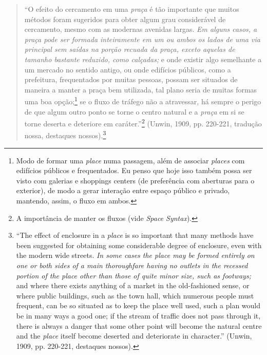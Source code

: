 \documentclass[12pt, a4paper]{book} %
\begin{document}
        \begin{quotation}
            ``O efeito do cercamento em uma \textit{praça} é tão importante que muitos métodos foram sugeridos para obter algum grau considerável de cercamento, mesmo com as modernas avenidas largas. \textit{Em alguns casos, a praça pode ser formada inteiramente em um ou ambos os lados de uma via principal sem saídas na porção recuada da praça, exceto aquelas de tamanho bastante reduzido, como calçadas;} e onde existir algo semelhante a um mercado no sentido antigo, ou onde edifícios públicos, como a prefeitura, frequentados por muitas pessoas, possam ser situados de maneira a manter a praça bem utilizada, tal plano seria de muitas formas uma boa opção;\footnote[67]{Modo de formar uma \textit{place} numa passagem, além de associar \textit{places} com edifícios públicos e frequentados.
            Eu penso que hoje isso também possa ser visto com galerias e shoppings centers (de preferência com aberturas para o exterior), de modo a gerar interação entre espaço público e privado, mantendo, assim, o fluxo em ambos.} se o fluxo de tráfego não a atravessar, há sempre o perigo de que algum outro ponto se torne o centro natural e a \textit{praça} em si se torne deserta e deteriore em caráter.''\footnote[68]{A importância de manter os fluxos (vide \textit{Space Syntax}).} (Unwin, 1909, pp. 220-221, tradução nossa, destaques nossos).\footnote[69]{``The effect of enclosure in a \textit{place} is so important that many methods have been suggested for obtaining some considerable degree of enclosure, even with the modern wide streets. \textit{In some cases the place may be formed entirely on one or both sides of a main thoroughfare having no outlets in the recessed portion of the place other than those of quite minor size, such as footways;} and where there exists anything of a market in the old-fashioned sense, or where public buildings, such as the town hall, which numerous people must frequent, can be so situated as to keep the place well used, such a plan would be in many ways a good one; if the stream of traffic does not pass through it, there is always a danger that some other point will become the natural centre and the \textit{place} itself become deserted and deteriorate in character.'' (Unwin, 1909, pp. 220-221, destaques nossos).}
        \end{quotation}
\end{document}

